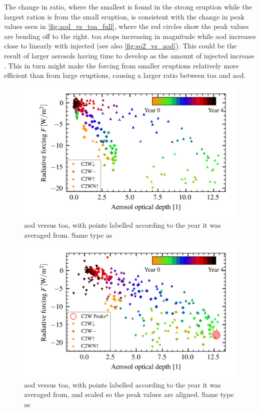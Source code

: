 \documentclass[twocol]{ametsocV5}
\begin{document}
The change in ratio, where the smallest is found in the strong eruption while the
largest ration is from the small eruption, is consistent with the change in peak values
seen in \cref{fig:aod_vs_toa_full}, where the red circles show the peak values are
bending off to the right. \acrshort{toa} stops increasing in magnitude while
\acrshort{aod} increases close to linearly with injected  (see also
\cref{fig:so2_vs_aod}). This could be the result of larger aerosols having time to
develop as the amount of injected  increase \citep{marshall2019}. This in turn
might make the forcing from smaller eruptions relatively more efficient than from large
eruptions, causing a larger ratio between \acrshort{toa} and \acrshort{aod}.

\begin{figure}
  \begin{center}
    \includegraphics[width=0.95\linewidth]{figures/aod_vs_toa_avg_loop.png}
  \end{center}
  \caption{
    \acrshort{aod} versus \acrshort{toa}, with points labelled according to the
    year it was averaged from. Same type as \citet{gregory2016}
  }%
  \label{fig:aod_vs_toa_avg_loop}
\end{figure}

\begin{figure}
  \begin{center}
    \includegraphics[width=0.95\linewidth]{figures/aod_vs_toa_avg_loop_scaled.png}
  \end{center}
  \caption{
    \acrshort{aod} versus \acrshort{toa}, with points labelled according to the
    year it was averaged from, and scaled so the peak values are aligned. Same type as
    \citet{gregory2016}
  }%
  \label{fig:aod_vs_toa_avg_loop_scaled}
\end{figure}
\end{document}
